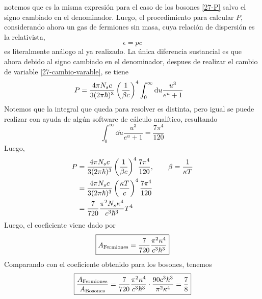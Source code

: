 \begin{sol}
\begin{equation}
\end{equation}
notemos que es la misma expresión para el caso de los bosones \eqref{27-P} salvo el signo cambiado en el denominador. Luego, el procedimiento para calcular $P$, considerando ahora un gas de fermiones sin masa, cuya relación de dispersión es la relativista,
\begin{equation}
  \epsilon=pc
\end{equation}
es literalmente análogo al ya realizado. La única diferencia sustancial es que ahora debido al signo cambiado en el denominador, despues de realizar el cambio de variable \eqref{27-cambio-varable}, se tiene
\begin{align}
  P&=\frac{4\pi N_sc}{3(2\pi\hbar)^3}\left(\frac{1}{\beta c}\right)^4\int_0^\infty \dd u\frac{u^3}{e^{u}+1}
\end{align}
Notemos que la integral que queda para resolver es distinta, pero igual se puede realizar con ayuda de algún software de cálculo analítico, resultando
\begin{equation}
  \int_0^\infty \dd u\frac{u^3}{e^{u}+1}=\frac{7\pi^4}{120}
\end{equation}
Luego,
\begin{align}
  P &=\frac{4\pi N_sc}{3(2\pi\hbar)^3}\left(\frac{1}{\beta c}\right)^4\frac{7\pi^4}{120},\qquad \beta=\frac{1}{\kappa T}\\
  &=\frac{4\pi N_sc}{3(2\pi\hbar)^3}\left(\frac{\kappa T}{c}\right)^4\frac{7\pi^4}{120}\\
  &=\frac{7}{720}\frac{\pi^2N_s\kappa^4}{c^3\hbar^3}T^4
\end{align}
Luego, el coeficiente viene dado por
\begin{equation}
  \boxed{A_{\rm Fermiones}=\frac{7}{720}\frac{\pi^2\kappa^4}{c^3\hbar^3}}
\end{equation}
Comparando con el coeficiente obtenido para los bosones, tenemos
\begin{equation}
  \boxed{\frac{A_{\rm Fermiones}}{A_{\rm Bosones}}=\frac{7}{720}\frac{\pi^2\kappa^4}{c^3\hbar^3}\cdot \frac{90c^3\hbar^3}{\pi^2\kappa^4}=\frac{7}{8}}
\end{equation}


\end{sol}
